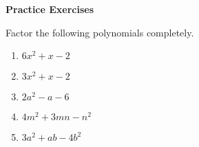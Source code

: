 \textbf{Practice Exercises}

\vspce

Factor the following polynomials completely. 

\begin{enumerate}

\item \hspce $6x^{2} + x - 2$
\item \hspce $3x^{2} + x - 2$
\item \hspce $2a^{2} - a - 6		$
\item \hspce $4m^{2} + 3mn - n^2$
\item \hspce $3a^{2} + ab - 4b^2$

\end{enumerate}
